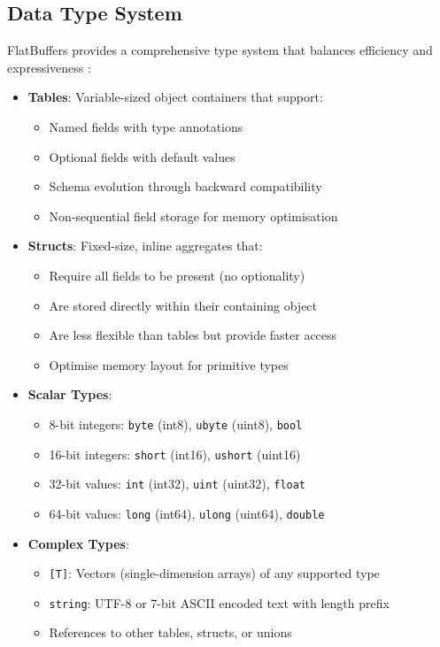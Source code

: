 \subsection{Data Type System}
\label{tb:flatbuffers:data_type_system}

FlatBuffers provides a comprehensive type system that balances efficiency and expressiveness \citep{flatbuffers_data_types}:

\begin{itemize}
  \item \textbf{Tables}: Variable-sized object containers that support:
    \begin{itemize}
      \item Named fields with type annotations
      \item Optional fields with default values
      \item Schema evolution through backward compatibility
      \item Non-sequential field storage for memory optimisation
    \end{itemize}

  \item \textbf{Structs}: Fixed-size, inline aggregates that:
    \begin{itemize}
      \item Require all fields to be present (no optionality)
      \item Are stored directly within their containing object
      \item Are less flexible than tables but provide faster access
      \item Optimise memory layout for primitive types
    \end{itemize}

  \item \textbf{Scalar Types}:
    \begin{itemize}
      \item 8-bit integers: \texttt{byte} (int8), \texttt{ubyte} (uint8), \texttt{bool}
      \item 16-bit integers: \texttt{short} (int16), \texttt{ushort} (uint16)
      \item 32-bit values: \texttt{int} (int32), \texttt{uint} (uint32), \texttt{float}
      \item 64-bit values: \texttt{long} (int64), \texttt{ulong} (uint64), \texttt{double}
    \end{itemize}

  \item \textbf{Complex Types}:
    \begin{itemize}
      \item \texttt{[T]}: Vectors (single-dimension arrays) of any supported type
      \item \texttt{string}: UTF-8 or 7-bit ASCII encoded text with length prefix
      \item References to other tables, structs, or unions
    \end{itemize}


\end{itemize}

